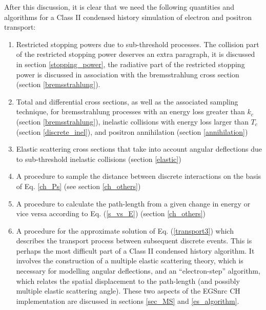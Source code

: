 After this discussion, it is clear that we need the following
quantities and algorithms for a Class II condensed
history simulation of electron and positron transport:
\begin{enumerate}
\item
{}
Restricted stopping powers due to sub-threshold processes.
The collision part of the restricted stopping power deserves
an extra paragraph, it is discussed in section \ref{stopping_power}, the
radiative part of the restricted stopping power is
discussed in association with the bremsstrahlung cross section
(section \ref{bremsstrahlung}).
\item
{}
Total and differential cross sections, as well as
the associated sampling technique, for bremsstrahlung
processes with an energy loss greater than $k_c$
(section \ref{bremsstrahlung}),
inelastic collisions with energy loss larger than $T_c$
(section \ref{discrete_inel}), and positron annihilation
(section \ref{annihilation})
\item
{}
Elastic scattering cross sections that take into account
angular deflections due to sub-threshold inelastic
collisions (section \ref{elastic})
\item
{}
A procedure to sample the distance between discrete
interactions on the basis of Eq. \eqref{ch_Ps}
(see section \ref{ch_others})
\item
{}
A procedure to calculate the path-length from a given
change in energy or vice versa according to
Eq. (\ref{s_vs_E}) (section \ref{ch_others})
\item
{}
A procedure for the approximate solution of
Eq. (\ref{transport3}) which describes the
transport process between subsequent discrete events.
This is perhaps the most difficult part of a
Class II  condensed history algorithm.  It
involves the construction of a multiple elastic scattering
theory, which is necessary for modelling angular deflections,
and an ``electron-step'' algorithm, which relates the
spatial displacement to the path-length (and possibly
multiple elastic scattering angle). These two aspects
of the EGSnrc CH implementation are discussed
in sections \ref{sec_MS} and \ref{es_algorithm}.
\end{enumerate}

